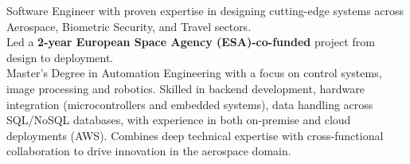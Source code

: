 

\begin{cvparagraph}

Software Engineer with proven expertise in designing cutting-edge systems across Aerospace, Biometric Security, and Travel sectors. \\
Led a \textbf{2-year European Space Agency (ESA)-co-funded} project from design to deployment. \\
Master's Degree in Automation Engineering with a focus on control systems, image processing and robotics. 
Skilled in backend development, hardware integration (microcontrollers and embedded systems), data handling across SQL/NoSQL databases, with experience in both on-premise and cloud deployments (AWS).
Combines deep technical expertise with cross-functional collaboration to drive innovation in the aerospace domain.
\end{cvparagraph}
